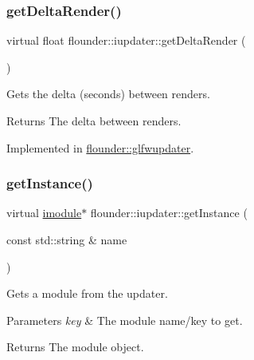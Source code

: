 \mbox{\label{classflounder_1_1iupdater_a242d2c4bef63ac11560ac4f13dd4ad3f}} 
\subsubsection{\texorpdfstring{get\+Delta\+Render()}{getDeltaRender()}}
{\footnotesize\ttfamily virtual float flounder\+::iupdater\+::get\+Delta\+Render (\begin{DoxyParamCaption}{ }\end{DoxyParamCaption})\hspace{0.3cm}{\ttfamily [pure virtual]}}



Gets the delta (seconds) between renders. 

\begin{DoxyReturn}{Returns}
The delta between renders. 
\end{DoxyReturn}


Implemented in \hyperlink{classflounder_1_1glfwupdater_aad1dda11a40273c2a18e7974f42f59dc}{flounder\+::glfwupdater}.

\mbox{\label{classflounder_1_1iupdater_a391b1788b5c139b199ed48033da1b88d}} 
\subsubsection{\texorpdfstring{get\+Instance()}{getInstance()}}
{\footnotesize\ttfamily virtual \hyperlink{classflounder_1_1imodule}{imodule}$\ast$ flounder\+::iupdater\+::get\+Instance (\begin{DoxyParamCaption}\item[{const std\+::string \&}]{name }\end{DoxyParamCaption})\hspace{0.3cm}{\ttfamily [pure virtual]}}



Gets a module from the updater. 


\begin{DoxyParams}{Parameters}
{\em key} & The module name/key to get. \\
\hline
\end{DoxyParams}
\begin{DoxyReturn}{Returns}
The module object. 
\end{DoxyReturn}



